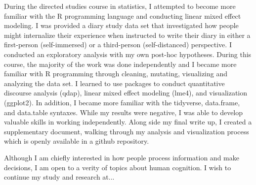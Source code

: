 During the directed studies course in statistics, I attempted to become more familiar with the R programming language and conducting linear mixed effect modeling. I was provided a diary study data set that investigated how people might internalize their experience when instructed to write their diary in either a first-person (self-immersed) or a third-person (self-distanced) perspective. I conducted an exploratory analysis with my own post-hoc hypotheses. During this course, the majority of the work was done independently and I became more familiar with R programming through cleaning, mutating, visualizing and analyzing the data set. I learned to use packages to conduct quantitative discourse analysis (qdap), linear mixed effect modeling (lme4), and visualization (ggplot2). In addition, I became more familiar with the tidyverse, data.frame, and data.table syntaxes. While my results were negative, I was able to develop valuable skills in working independently. Along side my final write up, I created a supplementary document, walking through my analysis and visualization process which is openly available in a github repository.

Although I am chiefly interested in how people process information and make decisions, I am open to a verity of topics about human cognition. I wish to continue my study and research at...


